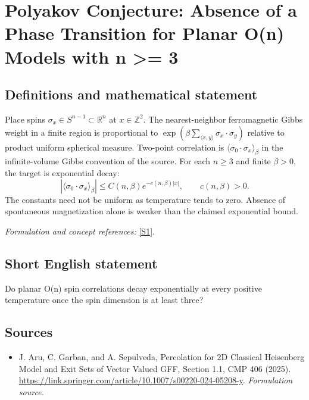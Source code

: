 \documentclass[11pt]{article}
\begin{document}
\section*{\texorpdfstring{Polyakov Conjecture: Absence of a Phase Transition for Planar O(n) Models with n >= 3}{Polyakov Conjecture: Absence of a Phase Transition for Planar O(n) Models with n >= 3}}\label{30006780}
\subsection{Definitions and mathematical statement}
Place spins $\sigma_x\in S^{n-1}\subset{\mathbb{R}}^n$ at $x\in{\mathbb{Z}}^2$. The nearest-neighbor ferromagnetic Gibbs weight in a finite region is proportional to
$\exp(\beta\sum_{\langle x,y\rangle}\sigma_x\cdot\sigma_y)$ relative to product uniform spherical measure. Two-point correlation is $\langle\sigma_0\cdot\sigma_x\rangle_\beta$ in the infinite-volume Gibbs convention of the source. For each $n\ge3$ and finite $\beta>0$, the target is exponential decay:
\[
 |\langle\sigma_0\cdot\sigma_x\rangle_\beta|\le C(n,\beta)e^{-c(n,\beta)|x|},
 \qquad c(n,\beta)>0.
\]
The constants need not be uniform as temperature tends to zero. Absence of spontaneous magnetization alone is weaker than the claimed exponential bound.
\par\smallskip\textit{Formulation and concept references:} \href{https://link.springer.com/article/10.1007/s00220-024-05208-y}{[S1]}.

\subsection{Short English statement}
Do planar O(n) spin correlations decay exponentially at every positive temperature once the spin dimension is at least three?
\subsection{Sources}
\begin{itemize}
\item[S1]J. Aru, C. Garban, and A. Sepulveda, Percolation for 2D Classical Heisenberg Model and Exit Sets of Vector Valued GFF, Section 1.1, CMP 406 (2025).
\url{https://link.springer.com/article/10.1007/s00220-024-05208-y}.
\textit{Formulation source.}
\end{itemize}
\end{document}
